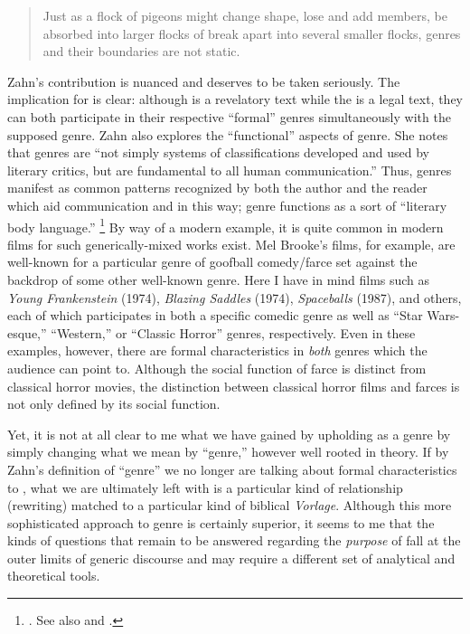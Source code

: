 \begin{quote}
    Just as a flock of pigeons might change shape, lose and add members, be absorbed into larger flocks of break apart into several smaller flocks, genres and their boundaries are not static.\autocite[277]{zahn_jbl2012}
\end{quote} 

Zahn's contribution is nuanced and deserves to be taken seriously. The implication for \rwb is clear: although \jub is a revelatory text while the \templescroll is a legal text, they can both participate in their respective ``formal'' genres simultaneously with the supposed \rwb genre. Zahn also explores the ``functional'' aspects of genre. She notes that genres are ``not simply systems of classifications developed and used by literary critics, but are fundamental to all human communication.''\autocite[280]{zahn_jbl2012} Thus, genres manifest as common patterns recognized by both the author and the reader which aid communication and in this way; genre functions as a sort of ``literary body language.''%
%
\footnote{\cite[276]{zahn_jbl2012}. See also \cite[199]{newsom_grossman2010} and \cite[37-53]{fowler2002}.}
%
By way of a modern example, it is quite common in modern films for such generically-mixed works exist. Mel Brooke's films, for example, are well-known for a particular genre of goofball comedy/farce set against the backdrop of some other well-known genre. Here I have in mind films such as \emph{Young Frankenstein} (1974), \emph{Blazing Saddles} (1974), \emph{Spaceballs} (1987), and others, each of which participates in both a specific comedic genre as well as ``Star Wars-esque,'' ``Western,'' or ``Classic Horror'' genres, respectively. Even in these examples, however, there are formal characteristics in \emph{both} genres which the audience can point to. Although the social function of farce is distinct from classical horror movies, the distinction between classical horror films and farces is not only defined by its social function. 

Yet, it is not at all clear to me what we have gained by upholding \rwb as a genre by simply changing what we mean by ``genre,'' however well rooted in theory.\autocite[Machiela critiques Zahn's approach for similar reasons. See][]{machiela_jjs2010} If by Zahn's definition of ``genre'' we no longer are talking about formal characteristics to \rwb, what we are ultimately left with is a particular kind of relationship (rewriting) matched to a particular kind of biblical \emph{Vorlage}. Although this more sophisticated approach to genre is certainly superior, it seems to me that the kinds of questions that remain to be answered regarding the \emph{purpose} of \rwb fall at the outer limits of generic discourse and may require a different set of analytical and theoretical tools.